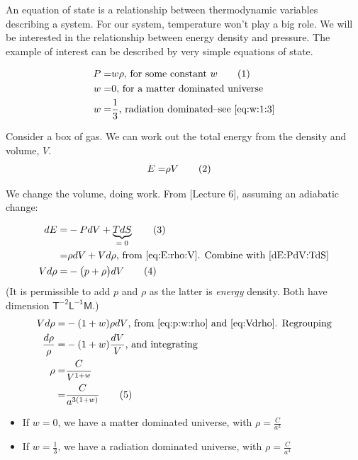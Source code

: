 \documentclass[]{article}
\newcommand\numberthis{\addtocounter{equation}{1}\tag{\theequation}}
\begin{document}
An equation of state is a relationship between thermodynamic variables describing a system. For our system, temperature won't play a big role. We will be interested in the relationship between energy density and pressure. The example of interest can be described by very simple equations of state.

\begin{align*}
	P =& w \rho\text{, for some constant $w$} \numberthis \label{eq:p:w:rho}\\
	w =& 0 \text {, for a matter dominated universe}\\
	w =& \frac{1}{3} \text{, radiation dominated--see \eqref{eq:w:1:3}}
\end{align*}

Consider a box of gas. We can work out the total energy from the density and volume, $V$.
\begin{align*}
	E =& \rho V \numberthis \label{eq:E:rho:V}
\end{align*}
 
We change the volume, doing work. From \cite{susskind2013statistical}[Lecture 6], assuming an adiabatic change:

\begin{align*}
	dE =& -P dV + \underbrace{T dS}_\text{$=0$} \numberthis \label{dE:PdV:TdS}\\
	=& \rho dV + V d\rho \text{, from \eqref{eq:E:rho:V}. Combine with \eqref{dE:PdV:TdS}}\\
	V d\rho =& -\big(p+\rho\big)dV \numberthis \label{eq:Vdrho}
\end{align*}
(It is permissible to add $p$ and $\rho$ as the latter is \emph{energy} density. Both have dimension $\mathsf{T^{-2}L^{-1}M}$.)
\begin{align*}
	V d\rho =& - (1+w)\rho dV \text{, from \eqref{eq:p:w:rho} and \eqref{eq:Vdrho}. Regrouping}\\
	\frac{d\rho}{\rho} =& - (1+w)\frac{dV}{V} \text{, and integrating}\\
	\rho =& \frac{C}{V^{1+w}}\\
	=& \frac{C}{a^{3(1+w)}}\numberthis \label{eq:rho:a}
\end{align*}

\begin{itemize}
	\item If $w=0$, we have a matter dominated universe, with $\rho=\frac{C}{a^3}$
	\item If $w=\frac{1}{3}$, we have a radiation  dominated universe, with $\rho=\frac{C}{a^4}$
\end{itemize}
\end{document}
